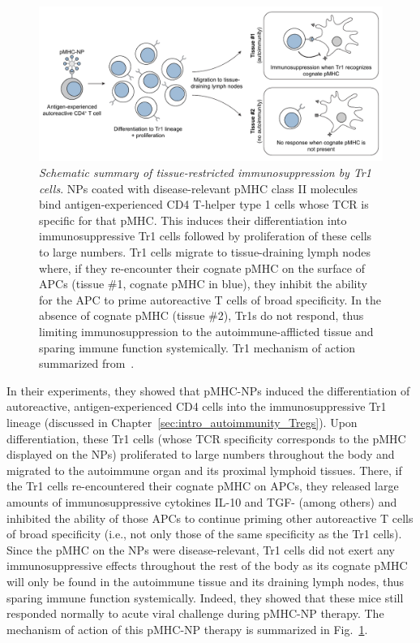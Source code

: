 \begin{figure}
    \centering
    \includegraphics[width=\textwidth]{Figures/intro/fig5_Tr1scheme.pdf}
    \caption[Schematic summary of tissue-restricted immunosuppression by Tr1 cells]{%
    \textit{Schematic summary of tissue-restricted immunosuppression by Tr1 cells}. %
    NPs coated with disease-relevant pMHC class II molecules bind antigen-experienced CD4\pos{} T-helper type 1 cells whose TCR is specific for that pMHC. This induces their differentiation into immunosuppressive Tr1 cells followed by proliferation of these cells to large numbers. Tr1 cells migrate to tissue-draining lymph nodes where, if they re-encounter their cognate pMHC on the surface of APCs (tissue \#1, cognate pMHC in blue), they inhibit the ability for the APC to prime autoreactive T cells of broad specificity. In the absence of cognate pMHC (tissue \#2), Tr1s do not respond, thus limiting immunosuppression to the autoimmune-afflicted tissue and sparing immune function systemically. Tr1 mechanism of action summarized from~\cite{clemente2016expanding}.}
    \label{fig:intro_Tr1}
\end{figure}

In their experiments, they showed that pMHC-NPs induced the differentiation of autoreactive, antigen-experienced CD4\pos{} cells into the immunosuppressive Tr1 lineage (discussed in Chapter~\ref{sec:intro_autoimmunity_Tregs}). Upon differentiation, these Tr1 cells (whose TCR specificity corresponds to the pMHC displayed on the NPs) proliferated to large numbers throughout the body and migrated to the autoimmune organ and its proximal lymphoid tissues. There, if the Tr1 cells re-encountered their cognate pMHC on APCs, they released large amounts of immunosuppressive cytokines IL-10 and TGF-\textbeta{} (among others) and inhibited the ability of those APCs to continue priming other autoreactive T cells of broad specificity (i.e., not only those of the same specificity as the Tr1 cells). Since the pMHC on the NPs were disease-relevant, Tr1 cells did not exert any immunosuppressive effects throughout the rest of the body as its cognate pMHC will only be found in the autoimmune tissue and its draining lymph nodes, thus sparing immune function systemically. Indeed, they showed that these mice still responded normally to acute viral challenge during pMHC-NP therapy. The mechanism of action of this pMHC-NP therapy is summarized in Fig.~\ref{fig:intro_Tr1}.

